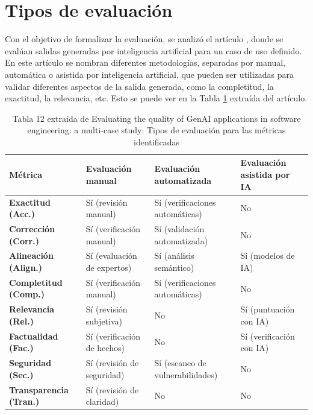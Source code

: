 \section{Tipos de evaluación}
\label{central-enfoque}

Con el objetivo de formalizar la evaluación, se analizó el artículo \cite{yu2026evaluating_genai_quality_multicase}, donde se evalúan salidas generadas por inteligencia artificial para un caso de uso definido. En este artículo se nombran diferentes metodologías, separadas por manual, automática o asistida por inteligencia artificial, que pueden ser utilizadas para validar diferentes aspectos de la salida generada, como la completitud, la exactitud, la relevancia, etc. Esto se puede ver en la Tabla \ref{table:aritculo-eval} extraída del artículo.

\begin{longtable} {|p{2.5cm} | p{2.5cm} | p{2.5cm} | p{2.5cm}|}
\caption{Tabla 12 extraída de Evaluating the quality of GenAI applications in software
engineering: a multi-case study: Tipos de evaluación para las métricas identificadas}
\label{table:aritculo-eval} \\
\hline
\textbf{Métrica} & \textbf{Evaluación manual} & \textbf{Evaluación automatizada} & \textbf{Evaluación asistida por IA} \\
\hline

\textbf{Exactitud (Acc.)} & 
Sí (revisión manual) & 
Sí (verificaciones automáticas) & 
No \\

\textbf{Corrección (Corr.)} & 
Sí (verificación manual) & 
Sí (validación automatizada) & 
No \\

\textbf{Alineación (Align.)} & 
Sí (evaluación de expertos) & 
Sí (análisis semántico) & 
Sí (modelos de IA) \\

\textbf{Completitud (Comp.)} & 
Sí (verificación manual) & 
Sí (verificaciones automáticas) & 
No \\

\textbf{Relevancia (Rel.)} & 
Sí (revisión subjetiva) & 
No & 
Sí (puntuación con IA) \\

\textbf{Factualidad (Fac.)} & 
Sí (verificación de hechos) & 
No & 
Sí (verificación con IA) \\

\textbf{Seguridad (Sec.)} & 
Sí (revisión de seguridad) & 
Sí (escaneo de vulnerabilidades) & 
No \\

\textbf{Transparencia (Tran.)} & 
Sí (revisión de claridad) & 
No & 
No \\

\hline
\end{longtable}

